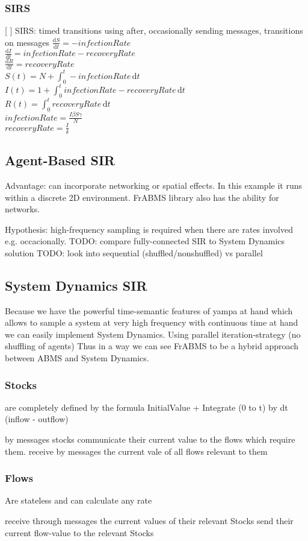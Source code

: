 \subsubsection{SIRS}
[ ] SIRS: timed transitions using after, occasionally sending messages, transitions on messages
$\frac{\mathrm d S}{\mathrm d t} = -infectionRate$ \\
$\frac{\mathrm d I}{\mathrm d t} = infectionRate - recoveryRate$ \\
$\frac{\mathrm d R}{\mathrm d t} = recoveryRate$ \\

$S(t) = N + \int_0^t -infectionRate\, \mathrm{d}t$ \\
$I(t) = 1 + \int_0^t infectionRate - recoveryRate\, \mathrm{d}t$ \\
$R(t) = \int_0^t recoveryRate\, \mathrm{d}t$ \\

$infectionRate = \frac{I \beta S \gamma}{N}$ \\
$recoveryRate = \frac{I}{\delta}$ \\

\subsection{Agent-Based SIR}
Advantage: can incorporate networking or spatial effects. In this example it runs within a discrete 2D environment. FrABMS library also has the ability for networks.

Hypothesis: high-frequency sampling is required when there are rates involved e.g. occacionally.
TODO: compare fully-connected SIR to System Dynamics solution
TODO: look into sequential (shuffled/nonshuffled) vs parallel

\subsection{System Dynamics SIR}
Because we have the powerful time-semantic features of yampa at hand which allows to sample a system at very high frequency with continuous time at hand we can easily implement System Dynamics.
Using parallel iteration-strategy (no shuffling of agents)
Thus in a way we can see FrABMS to be a hybrid approach between ABMS and System Dynamics.

\subsubsection{Stocks}
are completely defined by the formula
InitialValue + Integrate (0 to t) by dt (inflow - outflow)

by messages stocks communicate their current value to the flows which require them.
receive by messages the current vale of all flows relevant to them

\subsubsection{Flows}
Are stateless and can calculate any rate

receive through messages the current values of their relevant Stocks
send their current flow-value to the relevant Stocks